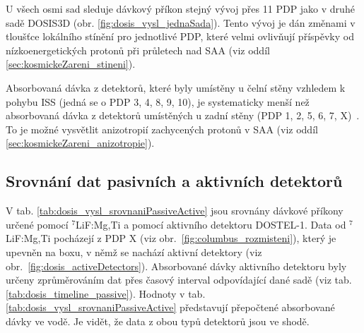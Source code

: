 U všech osmi sad sleduje dávkový příkon stejný vývoj přes 11 PDP jako v druhé sadě DOSIS3D (obr. \ref{fig:dosis_vysl_jednaSada}). Tento vývoj je  dán změnami v tloušťce lokálního stínění pro jednotlivé PDP, které velmi ovlivňují příspěvky od nízkoenergetických protonů při průletech nad SAA (viz oddíl \ref{sec:kosmickeZareni_stineni}). 

Absorbovaná dávka z detektorů, které byly umístěny u čelní stěny vzhledem k pohybu ISS (jedná se o PDP 3, 4, 8, 9, 10), je systematicky menší než absorbovaná dávka z detektorů umístěných u zadní stěny (PDP 1, 2, 5, 6, 7, X)~\cite{dosis}. To je možné vysvětlit anizotropií zachycených protonů v SAA (viz oddíl \ref{sec:kosmickeZareni_anizotropie}).
\subsection{Srovnání dat pasivních a aktivních detektorů}%
V tab. \ref{tab:dosis_vysl_srovnaniPassiveActive} jsou srovnány dávkové příkony určené pomocí $^7$LiF:Mg,Ti a pomocí aktivního detektoru DOSTEL-1. Data od $^7$LiF:Mg,Ti pocházejí z PDP X (viz obr.~\ref{fig:columbus_rozmisteni}), který je upevněn na boxu, v němž se nachází aktivní detektory (viz obr.~\ref{fig:dosis_activeDetectors}). Absorbované dávky aktivního detektoru byly určeny zprůměrováním dat přes časový interval odpovídající dané sadě (viz tab. \ref{tab:dosis_timeline_passive}). Hodnoty v tab. \ref{tab:dosis_vysl_srovnaniPassiveActive} představují přepočtené absorbované dávky ve vodě. Je vidět, že data z obou typů detektorů jsou ve shodě. 

